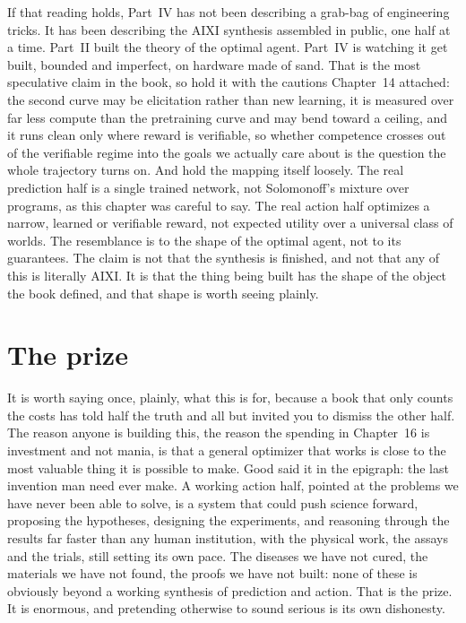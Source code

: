 If that reading holds, Part~IV has not been describing a grab-bag of engineering tricks. It has been describing the AIXI synthesis assembled in public, one half at a time. Part~II built the theory of the optimal agent. Part~IV is watching it get built, bounded and imperfect, on hardware made of sand. That is the most speculative claim in the book, so hold it with the cautions Chapter~14 attached: the second curve may be elicitation rather than new learning, it is measured over far less compute than the pretraining curve and may bend toward a ceiling, and it runs clean only where reward is verifiable, so whether competence crosses out of the verifiable regime into the goals we actually care about is the question the whole trajectory turns on. And hold the mapping itself loosely. The real prediction half is a single trained network, not Solomonoff's mixture over programs, as this chapter was careful to say. The real action half optimizes a narrow, learned or verifiable reward, not expected utility over a universal class of worlds. The resemblance is to the shape of the optimal agent, not to its guarantees. The claim is not that the synthesis is finished, and not that any of this is literally AIXI. It is that the thing being built has the shape of the object the book defined, and that shape is worth seeing plainly.

\section*{The prize}

It is worth saying once, plainly, what this is for, because a book that only counts the costs has told half the truth and all but invited you to dismiss the other half. The reason anyone is building this, the reason the spending in Chapter~16 is investment and not mania, is that a general optimizer that works is close to the most valuable thing it is possible to make. Good said it in the epigraph: the last invention man need ever make. A working action half, pointed at the problems we have never been able to solve, is a system that could push science forward, proposing the hypotheses, designing the experiments, and reasoning through the results far faster than any human institution, with the physical work, the assays and the trials, still setting its own pace. The diseases we have not cured, the materials we have not found, the proofs we have not built: none of these is obviously beyond a working synthesis of prediction and action. That is the prize. It is enormous, and pretending otherwise to sound serious is its own dishonesty.

